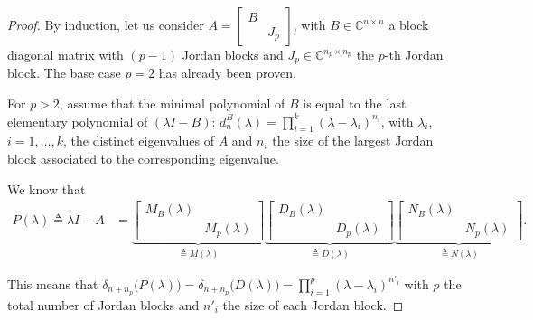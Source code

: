 \documentclass[11pt]{article}
\newcommand{\complex}{\mathbb{C}} %
\begin{document}
\begin{proof}
By induction, let us consider $A=\left[\begin{smallmatrix}
B & \\
 & J_p
\end{smallmatrix}\right]$, with $B \in \complex^{n\times n}$ a block diagonal matrix with $(p-1)$ Jordan blocks and $J_p\in \complex^{n_p\times n_p}$ the \(p\)-th Jordan block.
The base case $p = 2$ has already been proven.

For $p > 2$, assume that the minimal polynomial of $B$ is equal to the last elementary polynomial of $(\lambda I - B)$: $d_{n}^{B}(\lambda) = \prod_{i = 1}^k (\lambda - \lambda_i)^{n_i}$, with $\lambda_i$, $i= 1, \dots, k$, the distinct eigenvalues of \(A\) and $n_i$ the size of the largest Jordan block associated to the corresponding eigenvalue.

We know that
\begin{align*}
P(\lambda)\triangleq\lambda I - A 
&= \underbrace{\begin{bmatrix}
M_{B}(\lambda) & \\
& M_{p}(\lambda)
\end{bmatrix}}_{\triangleq M(\lambda)}\underbrace{\begin{bmatrix}
D_{B}(\lambda) & \\
& D_{p}(\lambda)
\end{bmatrix}}_{\triangleq D(\lambda)}\underbrace{\begin{bmatrix}
N_{B}(\lambda) & \\
& N_{p}(\lambda)
\end{bmatrix}}_{\triangleq N(\lambda)}.
\end{align*}

This means that $\delta_{n+n_p}\big(P(\lambda)\big) = \delta_{n+n_p}\big(D(\lambda)\big) = \prod_{i = 1}^p (\lambda - \lambda_i)^{n'_i}$ with $p$ the total number of Jordan blocks and $n'_i$ the size of each Jordan block.


\end{proof}
\end{document}
